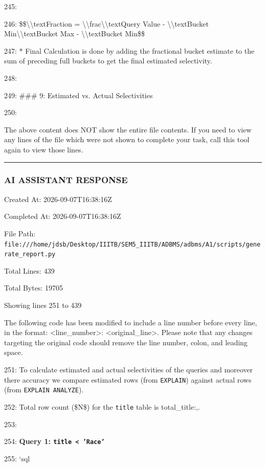 \documentclass[11pt,a4paper]{article}
\begin{document}
245:

246: \$\$\textbackslash{}\textbackslash{}text{{Fraction}} = \textbackslash{}\textbackslash{}frac{{\textbackslash{}\textbackslash{}text{{Query Value}} - \textbackslash{}\textbackslash{}text{{Bucket Min}}}}{{\textbackslash{}\textbackslash{}text{{Bucket Max}} - \textbackslash{}\textbackslash{}text{{Bucket Min}}}}\$\$

247: *   Final Calculation is done by adding the fractional bucket estimate to the sum of preceding full buckets to get the final estimated selectivity.

248:

249: \#\#\# 9: Estimated vs. Actual Selectivities

250:

The above content does NOT show the entire file contents. If you need to view any lines of the file which were not shown to complete your task, call this tool again to view those lines.


\hrule

\subsubsection{AI ASSISTANT RESPONSE}

Created At: 2026-09-07T16:38:16Z

Completed At: 2026-09-07T16:38:16Z

File Path: \texttt{file:///home/jdsb/Desktop/IIITB/SEM5\_IIITB/ADBMS/adbms/A1/scripts/generate\_report.py}

Total Lines: 439

Total Bytes: 19705

Showing lines 251 to 439

The following code has been modified to include a line number before every line, in the format: <line\_number>: <original\_line>. Please note that any changes targeting the original code should remove the line number, colon, and leading space.

251: To calculate estimated and actual selectivities of the queries and moreover there accuracy we compare estimated rows (from \texttt{EXPLAIN}) against actual rows (from \texttt{EXPLAIN ANALYZE}).

252: Total row count (\$N\$) for the \texttt{title} table is {total\_title:,}.

253:

254: \textbf{Query 1: \texttt{title < 'Race'}}

255: \texttt{}`sql
\end{document}
